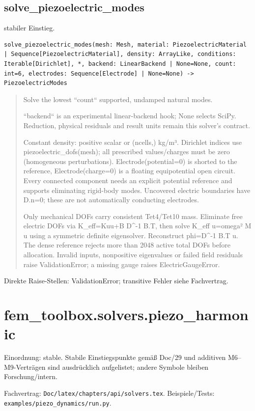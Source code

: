 \subsection{solve\_piezoelectric\_modes}
stabiler Einstieg.
\begin{lstlisting}
solve_piezoelectric_modes(mesh: Mesh, material: PiezoelectricMaterial | Sequence[PiezoelectricMaterial], density: ArrayLike, conditions: Iterable[Dirichlet], *, backend: LinearBackend | None=None, count: int=6, electrodes: Sequence[Electrode] | None=None) -> PiezoelectricModes
\end{lstlisting}
\begin{quote}
Solve the lowest ``count`` supported, undamped natural modes.\par ``backend`` is an experimental linear-backend hook; None selects SciPy. Reduction, physical residuals and result units remain this solver's contract.\par Constant density: positive scalar or (ncells,) kg/m³. Dirichlet indices use piezoelectric\_dofs(mesh); all prescribed values/charges must be zero (homogeneous perturbations). Electrode(potential=0) is shorted to the reference, Electrode(charge=0) is a floating equipotential open circuit. Every connected component needs an explicit potential reference and supports eliminating rigid-body modes. Uncovered electric boundaries have D.n=0; these are not automatically conducting electrodes.\par Only mechanical DOFs carry consistent Tet4/Tet10 mass. Eliminate free electric DOFs via K\_eff=Kuu+B D\textasciicircum{}-1 B.T, then solve K\_eff u=omega² M u using a symmetric definite eigensolver. Reconstruct phi=D\textasciicircum{}-1 B.T u. The dense reference rejects more than 2048 active total DOFs before allocation. Invalid inputs, nonpositive eigenvalues or failed field residuals raise ValidationError; a missing gauge raises ElectricGaugeError.
\end{quote}
Direkte Raise-Stellen: ValidationError; transitive Fehler siehe Fachvertrag.
\section{fem\_toolbox.solvers.piezo\_harmonic}
Einordnung: stable. Stabile Einstiegspunkte gemäß Doc/29 und additiven M6–M9-Verträgen sind ausdrücklich aufgelistet; andere Symbole bleiben Forschung/intern.
\par Fachvertrag: \nolinkurl{Doc/latex/chapters/api/solvers.tex}. Beispiele/Tests:
\nolinkurl{examples/piezo_dynamics/run.py}.
